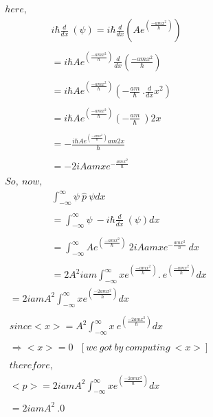 \documentclass{article}
\begin{document}
\begin{homeworkProblem}
\begin{align*}
   here,\\
   &i\hbar\frac{d}{dx}\ (\psi)= i\hbar\frac{d}{dx}(A e^{( \frac{-amx^{2}}{\hbar})})\\\\
   &=i\hbar A e^{( \frac{-amx^{2}}{\hbar})}\frac{d}{dx}(\frac{-amx^{2}}{\hbar})\\\\
   &=i\hbar A e^{( \frac{-amx^{2}}{\hbar})}(-\frac{am}{\hbar}\ . \frac{d}{dx}{x^{2}})\\\\
   &=i\hbar A e^{( \frac{-amx^{2}}{\hbar})}(-\frac{am}{\hbar}\ )2x\\\\
   &=-\frac{i\hbar A e^{( \frac{-amx^{2}}{\hbar})}am2x}{\hbar}\\\\
   &=-2iAamxe^{-\frac{amx^{2}}{\hbar}}\\\\
   So, \ now,\\
   &\int_{-\infty}^{\infty}\psi \ \hat{p}\ \psi dx\\\\
   &=\int_{-\infty}^{\infty}\psi \ -i\hbar\frac{d}{dx}\ (\psi) dx\\\\
   &=\int_{-\infty}^{\infty} A e^{( \frac{-amx^{2}}{\hbar})} \ 2iAamxe^{-\frac{amx^{2}}{\hbar}}\ dx\\\\
   &=2A^{2}iam\int_{-\infty}^{\infty} x e^{( \frac{-amx^{2}}{\hbar})}. \ e^{( \frac{-amx^{2}}{\hbar})} dx
\end{align*}
\newpage\vspace{5mm}
\hspace{20mm}
\large
\begin{align*}
  &=2iamA^{2}\int_{-\infty}^{\infty} x e^{(\frac{-2amx^{2}}{\hbar})} dx\\\\
  &since <x> = A^{2} \int_{-\infty}^{\infty}x\  e^{(\frac{-2amx^{2}}{\hbar})} dx \\\\
  &\Rightarrow<x>=0\ \ \ [we \ got\ by\ computing\ <x>] \\\\
  &therefore,\\
  &<p>=2iamA^{2}\int_{-\infty}^{\infty} x e^{(\frac{-2amx^{2}}{\hbar})} dx\\\\
  &=2iamA^{2} \ . 0 \\\\

\end{align*}
\end{homeworkProblem}
\end{document}
